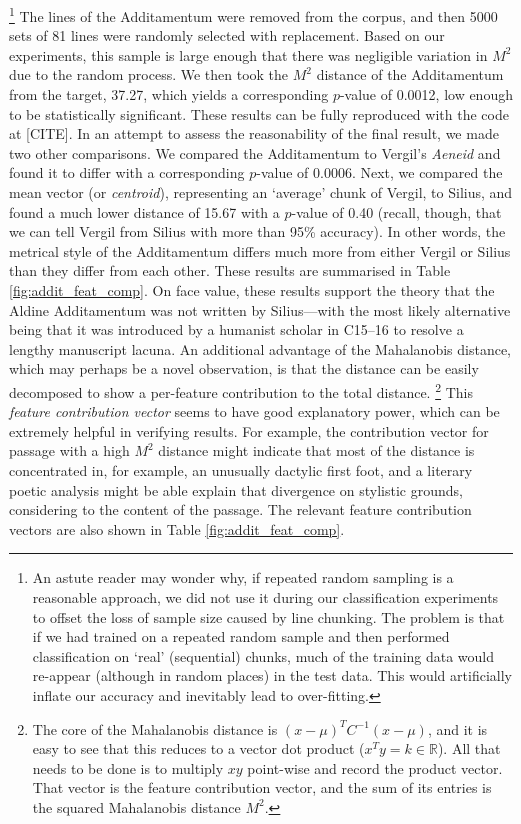 \documentclass[11pt,a4paper]{scrartcl} %
\begin{document}
\footnote{An astute reader may wonder why, if repeated random sampling is a reasonable approach, we did not use it during our classification experiments to offset the loss of sample size caused by line chunking. The problem is that if we had trained on a repeated random sample and then performed classification on `real' (sequential) chunks, much of the training data would re-appear (although in random places) in the test data. This would artificially inflate our accuracy and inevitably lead to over-fitting.}
The lines of the Additamentum were removed from the corpus, and then 5000 sets of 81 lines were randomly selected with replacement. Based on our experiments, this sample is large enough that there was negligible variation in $M^{2}$ due to the random process. We then took the $M^{2}$ distance of the Additamentum from the target, 37.27, which yields a corresponding $p$-value of 0.0012, low enough to be statistically significant. These results can be fully reproduced with the code at [CITE]. In an attempt to assess the reasonability of the final result, we made two other comparisons. We compared the Additamentum to Vergil's \textit{Aeneid} and found it to differ with a corresponding $p$-value of 0.0006. Next, we compared the mean vector (or \textit{centroid}), representing an `average' chunk of Vergil, to Silius, and found a much lower distance of 15.67 with a $p$-value of 0.40 (recall, though, that we can tell Vergil from Silius with more than 95\% accuracy). In other words, the metrical style of the Additamentum differs much more from either Vergil or Silius than they differ from each other. These results are summarised in Table \ref{fig:addit_feat_comp}. On face value, these results support the theory that the Aldine Additamentum was not written by Silius---with the most likely alternative being that it was introduced by a humanist scholar in C15--16 to resolve a lengthy manuscript lacuna. An additional advantage of the Mahalanobis distance, which may perhaps be a novel observation, is that the distance can be easily decomposed to show a per-feature contribution to the total distance.%
\footnote{The core of the Mahalanobis distance is $(x-\mu)^{T}C^{-1}(x-\mu)$, and it is easy to see that this reduces to a vector dot product ($x^{T}y=k \in \mathbb{R}$). All that needs to be done is to multiply $xy$ point-wise and record the product vector. That vector is the feature contribution vector, and the sum of its entries is the squared Mahalanobis distance $M^{2}$.}
This \textit{feature contribution vector} seems to have good explanatory power, which can be extremely helpful in verifying results. For example, the contribution vector for passage with a high $M^{2}$ distance might indicate that most of the distance is concentrated in, for example, an unusually dactylic first foot, and a literary poetic analysis might be able explain that divergence on stylistic grounds, considering to the content of the passage. The relevant feature contribution vectors are also shown in Table \ref{fig:addit_feat_comp}.
\end{document}
